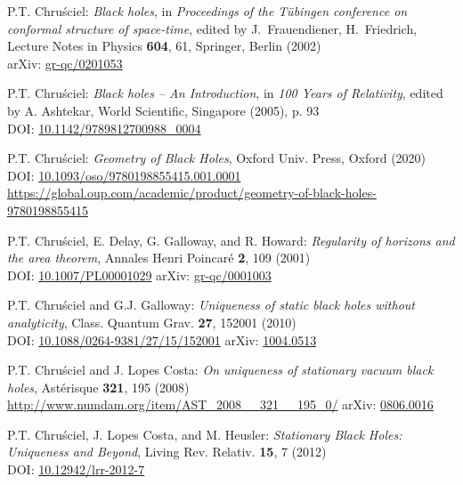 \begin{thebibliography}{123}
P.T. Chru\'sciel: {\em Black holes},
in {\em Proceedings of the T\"ubingen conference on conformal structure of
space-time}, edited by J.~Frauendiener, H.~Friedrich,
Lecture Notes in Physics {\bf 604}, 61,
Springer, Berlin (2002)\\
arXiv: \href{https://arxiv.org/abs/gr-qc/0201053}{gr-qc/0201053}

P.T. Chru\'sciel: {\em Black holes -- An Introduction},
in {\em 100 Years of Relativity}, edited by A. Ashtekar,
World Scientific, Singapore (2005), p. 93\\
DOI: \href{https://doi.org/10.1142/9789812700988_0004}{10.1142/9789812700988\_0004}

P.T. Chru\'sciel: {\em Geometry of Black Holes},
Oxford Univ. Press, Oxford (2020)\\
DOI: \href{https://doi.org/10.1093/oso/9780198855415.001.0001}{10.1093/oso/9780198855415.001.0001}\\
{\footnotesize \url{https://global.oup.com/academic/product/geometry-of-black-holes-9780198855415}}

P.T. Chru\'sciel, E. Delay, G. Galloway, and R. Howard:
{\em Regularity of horizons and the area theorem},
Annales Henri Poincar\'e {\bf 2}, 109 (2001)\\
DOI: \href{https://doi.org/10.1007/PL00001029}{10.1007/PL00001029}\hfill
arXiv: \href{https://arxiv.org/abs/gr-qc/0001003}{gr-qc/0001003}

P.T. Chru\'sciel and G.J. Galloway:
{\em Uniqueness of static black holes without analyticity},
Class. Quantum Grav. {\bf 27}, 152001 (2010)\\
DOI: \href{https://doi.org/10.1088/0264-9381/27/15/152001}{10.1088/0264-9381/27/15/152001}\hfill
arXiv: \href{https://arxiv.org/abs/1004.0513}{1004.0513}

P.T. Chru\'sciel and J. Lopes Costa:
{\em On uniqueness of stationary vacuum black holes},
Astérisque {\bf 321}, 195 (2008)\\
\url{http://www.numdam.org/item/AST_2008__321__195_0/}\hfill
arXiv: \href{https://arxiv.org/abs/0806.0016}{0806.0016}

P.T. Chru\'sciel, J. Lopes Costa, and M. Heusler:
{\em Stationary Black Holes: Uniqueness and Beyond},
Living Rev. Relativ. {\bf 15}, 7 (2012)\\
DOI: \href{https://doi.org/10.12942/lrr-2012-7}{10.12942/lrr-2012-7}


\end{thebibliography}
